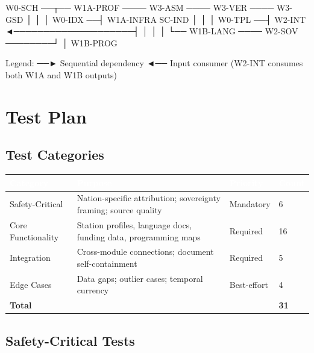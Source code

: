 \documentclass[11pt,letterpaper]{article}
\newcommand{\tableheader}[1]{\textbf{\sffamily\textcolor{white}{#1}}}
\begin{document}
\begin{asciibox}
W0-SCH ──┬── W1A-PROF ──── W3-ASM ──── W3-VER ──── W3-GSD
         │      │                         │
W0-IDX ──┤   W1A-INFRA                  SC-IND
         │      │                         │
W0-TPL ──┤   W2-INT ◄────────────────────┤
         │      │                         │
         └── W1B-LANG ──── W2-SOV ────────┘
                │
             W1B-PROG

Legend:
──►  Sequential dependency
◄──  Input consumer
     (W2-INT consumes both W1A and W1B outputs)
\end{asciibox}

\section{Test Plan}

\subsection{Test Categories}

\begin{center}
\begin{tabularx}{\textwidth}{L{3.5cm}XC{2cm}C{1.5cm}}
\toprule
{}
\tableheader{Category} & \tableheader{Purpose} & \tableheader{Priority} & \tableheader{Count} \\
\midrule
Safety-Critical & Nation-specific attribution; sovereignty framing; source quality & Mandatory & 6 \\
Core Functionality & Station profiles, language docs, funding data, programming maps & Required & 16 \\
Integration & Cross-module connections; document self-containment & Required & 5 \\
Edge Cases & Data gaps; outlier cases; temporal currency & Best-effort & 4 \\
\midrule
\textbf{Total} & & & \textbf{31} \\
\bottomrule
\end{tabularx}
\end{center}

\subsection{Safety-Critical Tests}
\end{document}
